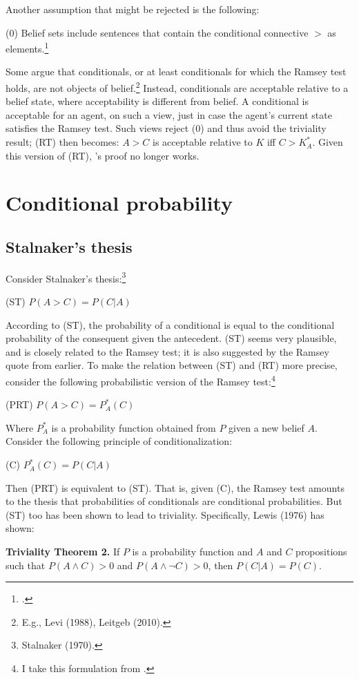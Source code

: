 \documentclass[12pt]{article}
\begin{document}
Another assumption that might be rejected is the following:

(0) Belief sets include sentences that contain the conditional connective $>$ as elements.\footnote{.}

Some argue that conditionals, or at least conditionals for which the Ramsey test holds, are not objects of belief.\footnote{E.g., Levi (1988), Leitgeb (2010).} Instead, conditionals are acceptable relative to a belief state, where acceptability is different from belief. A conditional is acceptable for an agent, on such a view, just in case the agent's current state satisfies the Ramsey test. Such views reject (0) and thus avoid the triviality result; (RT) then becomes: $A>C$ is acceptable relative to $K$ iff $C>K_A^*$. Given this version of (RT), \gf's proof no longer works.

\section{Conditional probability}

\subsection{Stalnaker's thesis}

Consider Stalnaker's thesis:\footnote{Stalnaker (1970).}

(ST) $P(A>C)=P(C|A)$

According to (ST), the probability of a conditional is equal to the conditional probability of the consequent given the antecedent. (ST) seems very plausible, and is closely related to the Ramsey test; it is also suggested by the Ramsey quote from earlier. To make the relation between (ST) and (RT) more precise, consider the following probabilistic version of the Ramsey test:\footnote{I take this formulation from .}

(PRT) $P(A>C)=P_A^*(C)$

Where $P_A^*$ is a probability function obtained from $P$ given a new belief $A$. Consider the following principle of conditionalization:

(C) $P_A^*(C)=P(C|A)$

Then (PRT) is equivalent to (ST). That is, given (C), the Ramsey test amounts to the thesis that probabilities of conditionals are conditional probabilities. But (ST) too has been shown to lead to triviality. Specifically, Lewis (1976) has shown:

\textbf{Triviality Theorem 2.} If $P$ is a probability function and $A$ and $C$ propositions such that $P(A\land C)>0$ and $P(A\land \neg C)>0$, then $P(C|A)=P(C)$.
\end{document}
